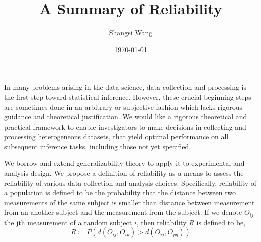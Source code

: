 \documentclass[a4paper]{article}
\title{A Summary of Reliability}
\author{Shangsi Wang}
\date{\today}
\begin{document}
\maketitle





\noindent In many problems arising in the data science, data collection and processing is the first step toward statistical inference. However, these crucial beginning steps are sometimes done in an arbitrary or subjective fashion which lacks rigorous guidance and theoretical justification. We would like a rigorous theoretical and practical framework to enable investigators to make decisions in collecting and processing heterogeneous datasets, that yield optimal performance on all subsequent inference tasks, including those not yet specified.

\noindent We borrow and extend generalizability theory to apply it to experimental and analysis design. We propose a definition of reliability as a means to assess the reliability of various data collection and analysis choices. Specifically, reliability of a population is defined to be the probability that the distance between two measurements of the same subject is smaller than distance between measurement from an another subject and the measurement from the subject. If we denote $O_{ij}$ the jth measurement of a random subject $i$, then reliability $R$ is defined to be,
\[R \coloneqq P(d(O_{ij},O_{ik})>d(O_{ij},O_{pq})) \]
\end{document}
